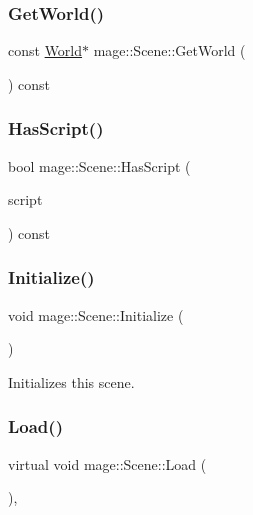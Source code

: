 \subsubsection{\texorpdfstring{Get\+World()}{GetWorld()}\hspace{0.1cm}{\footnotesize\ttfamily [2/2]}}
{\footnotesize\ttfamily const \hyperlink{classmage_1_1_world}{World}$\ast$ mage\+::\+Scene\+::\+Get\+World (\begin{DoxyParamCaption}{ }\end{DoxyParamCaption}) const}

\hypertarget{classmage_1_1_scene_a31469e19b181d0cb08bf10c554d28a6d}{}\label{classmage_1_1_scene_a31469e19b181d0cb08bf10c554d28a6d} 
\subsubsection{\texorpdfstring{Has\+Script()}{HasScript()}}
{\footnotesize\ttfamily bool mage\+::\+Scene\+::\+Has\+Script (\begin{DoxyParamCaption}\item[{const \hyperlink{namespacemage_a1e01ae66713838a7a67d30e44c67703e}{Shared\+Ptr}$<$ \hyperlink{classmage_1_1_behavior_script}{Behavior\+Script} $>$}]{script }\end{DoxyParamCaption}) const}

\hypertarget{classmage_1_1_scene_a3cd12ef381ca743bf0b8f8aa2a76eb57}{}\label{classmage_1_1_scene_a3cd12ef381ca743bf0b8f8aa2a76eb57} 
\subsubsection{\texorpdfstring{Initialize()}{Initialize()}}
{\footnotesize\ttfamily void mage\+::\+Scene\+::\+Initialize (\begin{DoxyParamCaption}{ }\end{DoxyParamCaption})}

Initializes this scene. \hypertarget{classmage_1_1_scene_a1fb4a93eaa2f6a9e20594e205abb9a32}{}\label{classmage_1_1_scene_a1fb4a93eaa2f6a9e20594e205abb9a32} 
\subsubsection{\texorpdfstring{Load()}{Load()}}
{\footnotesize\ttfamily virtual void mage\+::\+Scene\+::\+Load (\begin{DoxyParamCaption}{ }\end{DoxyParamCaption})\hspace{0.3cm}{\ttfamily [protected]}, {\ttfamily [virtual]}}

